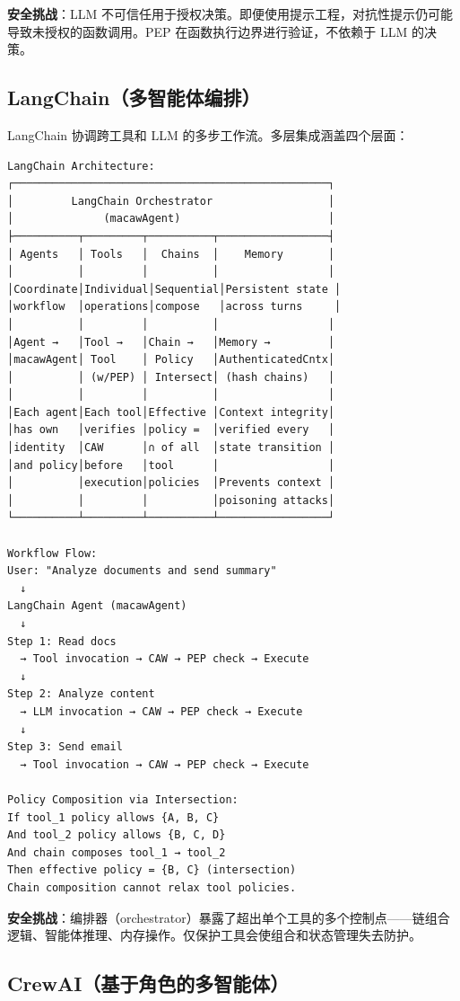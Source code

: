 {\textbf{安全挑战}：LLM 不可信任用于授权决策。即便使用提示工程，对抗性提示仍可能导致未授权的函数调用。PEP 在函数执行边界进行验证，不依赖于 LLM 的决策。

\subsection*{LangChain（多智能体编排）}

LangChain 协调跨工具和 LLM 的多步工作流。多层集成涵盖四个层面：

{\tiny
\begin{verbatim}
LangChain Architecture:
┌─────────────────────────────────────────────────┐
│         LangChain Orchestrator                  │
│              (macawAgent)                       │
├──────────┬─────────┬──────────┬─────────────────┤
│ Agents   │ Tools   │  Chains  │    Memory       │
│          │         │          │                 │
│Coordinate│Individual│Sequential│Persistent state │
│workflow  │operations│compose   │across turns     │
│          │         │          │                 │
│Agent →   │Tool →   │Chain →   │Memory →         │
│macawAgent│ Tool    │ Policy   │AuthenticatedCntx│
│          │ (w/PEP) │ Intersect│ (hash chains)   │
│          │         │          │                 │
│Each agent│Each tool│Effective │Context integrity│
│has own   │verifies │policy =  │verified every   │
│identity  │CAW      │∩ of all  │state transition │
│and policy│before   │tool      │                 │
│          │execution│policies  │Prevents context │
│          │         │          │poisoning attacks│
└──────────┴─────────┴──────────┴─────────────────┘

Workflow Flow:
User: "Analyze documents and send summary"
  ↓
LangChain Agent (macawAgent)
  ↓
Step 1: Read docs
  → Tool invocation → CAW → PEP check → Execute
  ↓
Step 2: Analyze content
  → LLM invocation → CAW → PEP check → Execute
  ↓
Step 3: Send email
  → Tool invocation → CAW → PEP check → Execute

Policy Composition via Intersection:
If tool_1 policy allows {A, B, C}
And tool_2 policy allows {B, C, D}
And chain composes tool_1 → tool_2
Then effective policy = {B, C} (intersection)
Chain composition cannot relax tool policies.
\end{verbatim}}

\textbf{安全挑战}：编排器（orchestrator）暴露了超出单个工具的多个控制点——链组合逻辑、智能体推理、内存操作。仅保护工具会使组合和状态管理失去防护。

\subsection*{CrewAI（基于角色的多智能体）}

}
